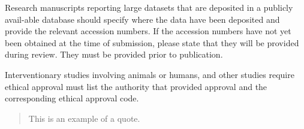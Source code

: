 \documentclass[water,article,submit,pdftex,moreauthors]{dependencies/Definitions/mdpi}
\begin{document}
Research manuscripts reporting large datasets that are deposited in a publicly avail-able database should specify where the data have been deposited and provide the relevant accession numbers. If the accession numbers have not yet been obtained at the time of submission, please state that they will be provided during review. They must be provided prior to publication.

Interventionary studies involving animals or humans, and other studies require ethical approval must list the authority that provided approval and the corresponding ethical approval code.
\begin{quote}
This is an example of a quote.
\end{quote}

\end{document}
